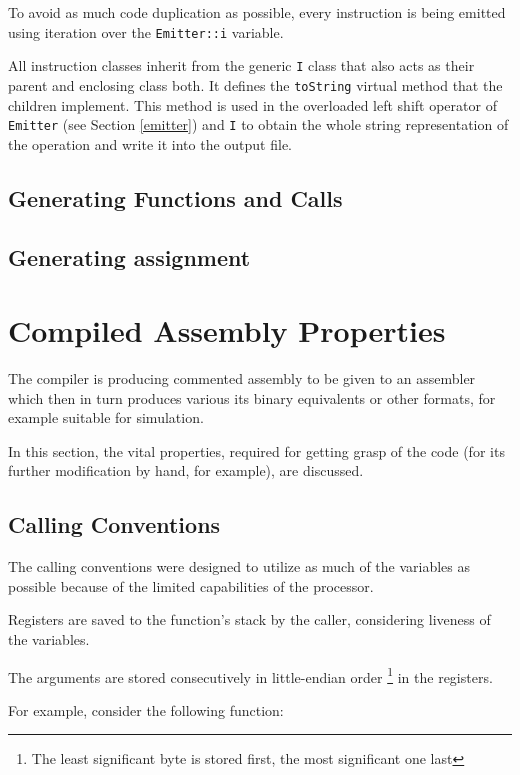     To avoid as much code duplication as possible, every instruction is being emitted using iteration over the \texttt{Emitter::i} variable.

    All instruction classes inherit from the generic \texttt{I} class that also acts as their parent and enclosing class both. It defines the \texttt{toString} virtual method that the children implement. This method is used in the overloaded left shift operator of \texttt{Emitter} (see Section \ref{emitter}) and \texttt{I} to obtain the whole string representation of the operation and write it into the output file.

        \subsection{Generating Functions and Calls}

        \subsection{Generating assignment}

    \section{Compiled Assembly Properties}

    The compiler is producing commented assembly to be given to an assembler which then in turn produces various its binary equivalents or other formats, for example suitable for simulation.

    In this section, the vital properties, required for getting grasp of the code (for its further modification by hand, for example), are discussed.

        \subsection{Calling Conventions}

        The calling conventions were designed to utilize as much of the variables as possible because of the limited capabilities of the processor.

        Registers are saved to the function's stack by the caller, considering liveness of the variables.

        The arguments are stored consecutively in little-endian order \footnote{The least significant byte is stored first, the most significant one last} in the registers.

        For example, consider the following function:

